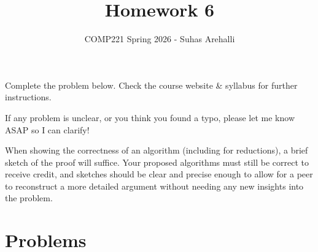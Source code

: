\documentclass{exam}
\title{Homework 6}
\author{COMP221 Spring 2026 - Suhas Arehalli}
\date{}
\theoremstyle{prob}
\begin{document}
\maketitle

Complete the problem below. Check the course website \& syllabus for further instructions.

If any problem is unclear, or you think you found a typo, please let me know ASAP so I can clarify!

When showing the correctness of an algorithm (including for reductions), a brief sketch of the proof will suffice. Your proposed algorithms must still be correct to receive credit, and sketches should be clear and precise enough to allow for a peer to reconstruct a more detailed argument without needing any new insights into the problem. 

\section*{Problems}
\end{document}
